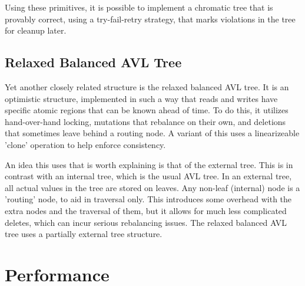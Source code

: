 \documentclass[finalreport,12pt]{elsarticle}
\begin{document}
Using these primitives, it is possible to implement a chromatic tree that is provably correct, using a try-fail-retry strategy, that marks violations in the tree for cleanup later\cite{Brown}. 


\subsection{Relaxed Balanced AVL Tree}

Yet another closely related structure is the relaxed balanced AVL tree. It is an optimistic structure, implemented in such a way that reads and writes have specific atomic regions that can be known ahead of time. To do this, it utilizes hand-over-hand locking, mutations that rebalance on their own, and deletions that sometimes leave behind a routing node\cite{Bronson}. A variant of this uses a linearizeable 'clone' operation to help enforce consistency. 

An idea this uses that is worth explaining is that of the external tree. This is in contrast with an internal tree, which is the usual AVL tree. In an external tree, all actual values in the tree are stored on leaves. Any non-leaf (internal) node is a 'routing' node, to aid in traversal only. This introduces some overhead with the extra nodes and the traversal of them, but it allows for much less complicated deletes, which can incur serious rebalancing issues. The relaxed balanced AVL tree uses a partially external tree structure\cite{Bronson}. 

\section{Performance}
\label{S:3}
    
\end{document}

